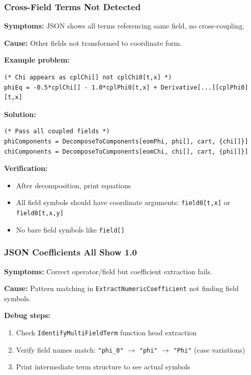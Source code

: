 \subsubsection{Cross-Field Terms Not Detected}

\textbf{Symptoms:} JSON shows all terms referencing same field, no cross-coupling.

\textbf{Cause:} Other fields not transformed to coordinate form.

\textbf{Example problem:}

\begin{lstlisting}[style=mathematica]
(* Chi appears as cplChi[] not cplChi0[t,x] *)
phiEq = -0.5*cplChi[] - 1.0*cplPhi0[t,x] + Derivative[...][cplPhi0][t,x]
\end{lstlisting}

\textbf{Solution:}

\begin{lstlisting}[style=mathematica]
(* Pass all coupled fields *)
phiComponents = DecomposeToComponents[eomPhi, phi[], cart, {chi[]}]
chiComponents = DecomposeToComponents[eomChi, chi[], cart, {phi[]}]
\end{lstlisting}

\textbf{Verification:}

\begin{itemize}
  \item After decomposition, print equations
  \item All field symbols should have coordinate arguments: \texttt{field0[t,x]} or \texttt{field0[t,x,y]}
  \item No bare field symbols like \texttt{field[]}
\end{itemize}

\subsubsection{JSON Coefficients All Show 1.0}

\textbf{Symptoms:} Correct operator/field but coefficient extraction fails.

\textbf{Cause:} Pattern matching in \texttt{ExtractNumericCoefficient} not finding field symbols.

\textbf{Debug steps:}

\begin{enumerate}
  \item Check \texttt{IdentifyMultiFieldTerm} function head extraction
  \item Verify field names match: \texttt{"phi\_0"} $\to$ \texttt{"phi"} $\to$ \texttt{"Phi"} (case variations)
  \item Print intermediate term structure to see actual symbols
\end{enumerate}

